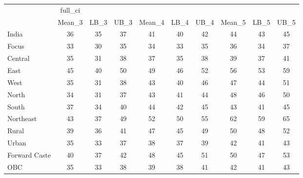 \begin{tabular}{l*{9}{c}}
\toprule
                    &     full\_ci&            &            &            &            &            &            &            &            \\
                    &      Mean\_3&        LB\_3&        UB\_3&      Mean\_4&        LB\_4&        UB\_4&      Mean\_5&        LB\_5&        UB\_5\\
\midrule
India               &          36&          35&          37&          41&          40&          42&          44&          43&          45\\
Focus               &          33&          30&          35&          34&          33&          35&          36&          34&          37\\
Central             &          35&          31&          38&          37&          35&          38&          39&          37&          41\\
East                &          45&          40&          50&          49&          46&          52&          56&          53&          59\\
West                &          35&          31&          38&          43&          40&          46&          47&          44&          51\\
North               &          34&          31&          37&          43&          41&          44&          48&          46&          50\\
South               &          37&          34&          40&          44&          42&          45&          43&          41&          45\\
Northeast           &          43&          37&          49&          52&          50&          55&          62&          59&          65\\
Rural               &          39&          36&          41&          47&          45&          49&          50&          48&          52\\
Urban               &          35&          33&          37&          38&          37&          39&          42&          41&          43\\
Forward Caste       &          40&          37&          42&          48&          45&          51&          50&          47&          53\\
OBC                 &          35&          33&          38&          39&          38&          41&          42&          41&          43\\

\end{tabular}
